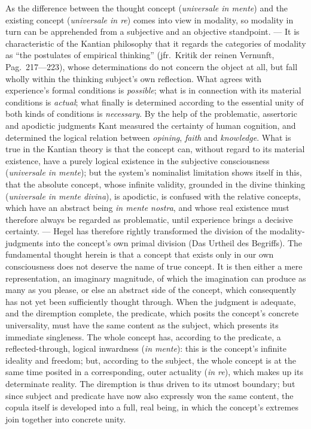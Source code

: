 \documentclass[12pt]{book}
\begin{document}
As the difference between the thought concept (\textit{universale in
mente}) and the existing concept (\textit{universale in re}) comes into view
in modality, so modality in turn can be apprehended from a subjective and an
objective standpoint. --- It is characteristic of the Kantian philosophy
that it regards the categories of modality as ``the postulates of empirical
thinking'' (jfr.\ Kritik der reinen Vernunft, Pag.\ 217---223), whose
determinations do not concern the object at all, but fall wholly within the
thinking subject's own reflection. What agrees with experience's formal
conditions is \emph{possible}; what is in connection with its material
conditions is \emph{actual}; what finally is determined according to the
essential unity of both kinds of conditions is \emph{necessary}. By the help
of the problematic, assertoric and apodictic judgments Kant measured the
certainty of human cognition, and determined the logical relation between
\emph{opining}, \emph{faith} and \emph{knowledge}. What is true in the
Kantian theory is that the concept can, without regard to its material
existence, have a purely logical existence in the subjective consciousness
(\textit{universale in mente}); but the system's nominalist limitation shows
itself in this, that the absolute concept, whose infinite validity, grounded
in the divine thinking (\textit{universale in mente divina}), is apodictic,
is confused with the relative concepts, which have an abstract being
\textit{in mente nostra}, and whose real existence must therefore always be
regarded as problematic, until experience brings a decisive certainty. ---
Hegel has therefore rightly transformed the division of the
modality-judgments into the concept's own primal division (Das Urtheil des
Begriffs). The fundamental thought herein is that a concept that exists only
in our own consciousness does not deserve the name of true concept. It is
then either a mere representation, an imaginary magnitude, of which the
imagination can produce as many as you please, or else an abstract side of
the concept, which consequently has not yet been sufficiently thought
through. When the judgment is adequate, and the diremption complete, the
predicate, which posits the concept's concrete universality, must have the
same content as the subject, which presents its immediate singleness. The
whole concept has, according to the predicate, a reflected-through, logical
inwardness (\textit{in mente}): this is the concept's infinite ideality and
freedom; but, according to the subject, the whole concept is at the same
time posited in a corresponding, outer actuality (\textit{in re}), which
makes up its determinate reality. The diremption is thus driven to its
utmost boundary; but since subject and predicate have now also expressly won
the same content, the copula itself is developed into a full, real being, in
which the concept's extremes join together into concrete unity.
\end{document}
